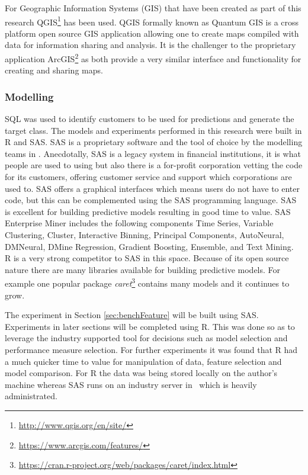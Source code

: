 For Geographic Information Systems (GIS) that have been created as part of this research QGIS\footnote{\url{http://www.qgis.org/en/site/}} has been used. QGIS formally known as Quantum GIS is a cross platform open source GIS application allowing one to create maps compiled with data for information sharing and analysis. It is the challenger to the proprietary application ArcGIS\footnote{\url{https://www.arcgis.com/features/}} as both provide a very similar interface and functionality for creating and sharing maps.

\subsubsection{Modelling}
SQL was used to identify customers to be used for predictions and generate the target class.
The models and experiments performed in this research were built in R and SAS. SAS is a proprietary software and the tool of choice by the modelling teams in \subjectname. Anecdotally, SAS is a legacy system in financial institutions, it is what people are used to using but also there is a for-profit corporation vetting the code for its customers, offering customer service and support which corporations are used to. SAS offers a graphical interfaces which means users do not have to enter code, but this can be complemented using the SAS programming language. SAS is excellent for building predictive models resulting in good time to value. SAS Enterprise Miner includes the following components Time Series, Variable Clustering, Cluster, Interactive Binning, Principal Components, AutoNeural, DMNeural, DMine Regression, Gradient Boosting, Ensemble, and Text Mining.
\\
R is a very strong competitor to SAS in this space. Because of its open source nature there are many libraries available for building predictive models. For example one popular package \textit{caret}\footnote{{\url{https://cran.r-project.org/web/packages/caret/index.html}}} contains many models and it continues to grow.

The experiment in Section \ref{sec:benchFeature} will be built using SAS. Experiments in later sections will be completed using R. This was done so as to leverage the industry supported tool for decisions such as model selection and performance measure selection. For further experiments it was found that R had a much quicker time to value for manipulation of data, feature selection and model comparison. For R the data was being stored locally on the author's machine whereas SAS runs on an industry server in \subjectname\ which is heavily administrated.  



